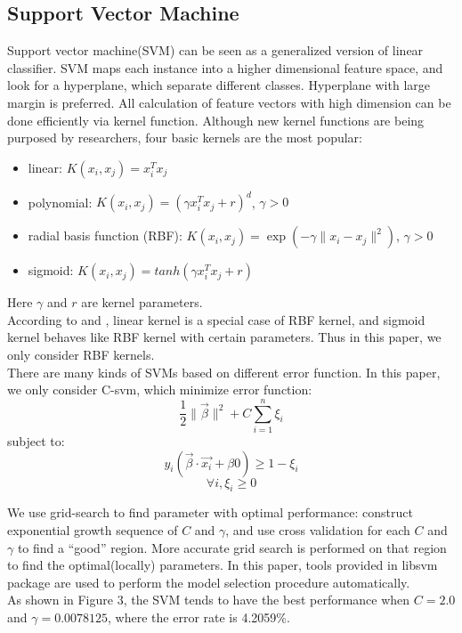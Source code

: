 \documentclass[a4paper,11pt]{nurop}
\begin{document}
\subsection{Support Vector Machine}
Support vector machine(SVM) can be seen as a generalized version of linear classifier. SVM maps each instance into a higher dimensional feature space, and look for a hyperplane, which separate different classes. Hyperplane with large margin is preferred. All calculation of feature vectors with high dimension can be done efficiently via kernel function. Although new kernel functions are being purposed by researchers, four basic kernels are the most popular\cite{svm}:
\begin{itemize}
\item linear: $K(x_i,x_j)=x_i^Tx_j$\\
\item polynomial: $K(x_i,x_j)=(\gamma x_i^Tx_j+r)^d$, $\gamma >0$\\
\item radial basis function (RBF): $K(x_i,x_j)=\exp(-\gamma \|x_i-x_j\|^2)$, $\gamma > 0$\\
\item sigmoid: $K(x_i,x_j)=tanh(\gamma x_i^Tx_j+r)$\\
\end{itemize}
Here $\gamma$ and $r$ are kernel parameters.\\
According to \cite{ssk} and \cite{ll}, linear kernel is a special case of RBF kernel, and sigmoid kernel behaves like RBF kernel with certain parameters. Thus in this paper, we only consider RBF kernels.\\
There are many kinds of SVMs based on different error function. In this paper, we only consider C-svm, which minimize error function:
    $$\frac{1}{2}\|\vec{\beta}\|^2+C\sum_{i=1}^n \xi_i$$
 subject to:$$y_i(\vec{\beta}\cdot \vec{x_i}+\beta{0})\geq 1-\xi_i$$$$\forall i, \xi_i\geq 0$$

 We use grid-search\cite{svm} to find parameter with optimal performance: construct exponential growth sequence of $C$ and $\gamma$, and use cross validation for each $C$ and $\gamma$ to find a ``good'' region. More accurate grid search is performed on that region to find the optimal(locally) parameters. In this paper, tools provided in libsvm\cite{libsvm} package are used to perform the model selection procedure automatically.\\
As shown in Figure 3, the SVM tends to have the best performance when $C=2.0$ and $\gamma=0.0078125$, where the error rate is 4.2059\%.
\end{document}
